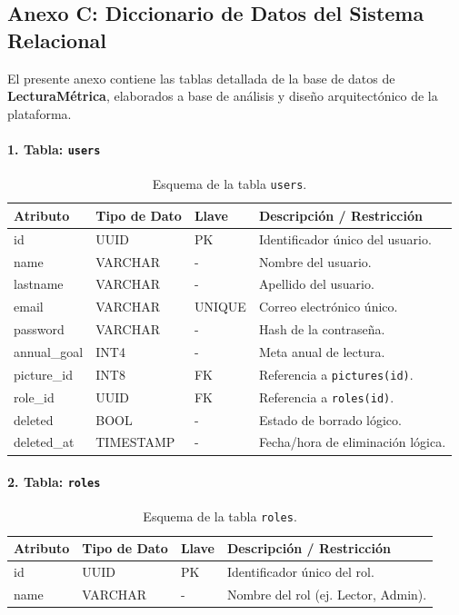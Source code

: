 \documentclass[12pt, atypical, journal]{article}
\begin{document}
\subsection*{Anexo C: Diccionario de Datos del Sistema Relacional}
El presente anexo contiene las tablas detallada de la base de datos de \textbf{LecturaMétrica}, elaborados a base de análisis y diseño arquitectónico de la plataforma. 

\paragraph{1. Tabla: \texttt{users}}
\begin{table}[H]
	\centering
	\begin{tabular}{|l|l|l|p{6.5cm}|}
		\hline
		\textbf{Atributo} & \textbf{Tipo de Dato} & \textbf{Llave} & \textbf{Descripción / Restricción} \\ \hline
		id & UUID & PK & Identificador único del usuario. \\ \hline
		name & VARCHAR & - & Nombre del usuario. \\ \hline
		lastname & VARCHAR & - & Apellido del usuario. \\ \hline
		email & VARCHAR & UNIQUE & Correo electrónico único. \\ \hline
		password & VARCHAR & - & Hash de la contraseña. \\ \hline
		annual\_goal & INT4 & - & Meta anual de lectura. \\ \hline
		picture\_id & INT8 & FK & Referencia a \texttt{pictures(id)}. \\ \hline
		role\_id & UUID & FK & Referencia a \texttt{roles(id)}. \\ \hline
		deleted & BOOL & - & Estado de borrado lógico. \\ \hline
		deleted\_at & TIMESTAMP & - & Fecha/hora de eliminación lógica. \\ \hline
	\end{tabular}
	\caption{Esquema de la tabla \texttt{users}.}
\end{table}

\paragraph{2. Tabla: \texttt{roles}}
\begin{table}[H]
	\centering
	\begin{tabular}{|l|l|l|p{6.5cm}|}
		\hline
		\textbf{Atributo} & \textbf{Tipo de Dato} & \textbf{Llave} & \textbf{Descripción / Restricción} \\ \hline
		id & UUID & PK & Identificador único del rol. \\ \hline
		name & VARCHAR & - & Nombre del rol (ej. Lector, Admin). \\ \hline
	\end{tabular}
	\caption{Esquema de la tabla \texttt{roles}.}
\end{table}
\end{document}
